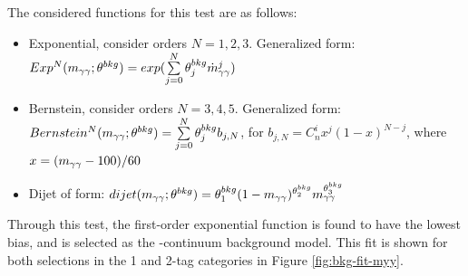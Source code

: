 The considered functions for this test are as follows:
\begin{itemize}
  \item Exponential, consider orders $N=1,2,3$. Generalized form: $Exp^N (m_{\gamma\gamma} ; \theta^{bkg}) = exp(\sum\limits_{j=0}^{N} \theta_j^{bkg} \dot m_{\gamma\gamma}^j)$
  \item Bernstein, consider orders $N=3,4,5$. Generalized form: $Bernstein^N (m_{\gamma\gamma} ; \theta^{bkg}) = \sum\limits_{j=0}^{N} \theta_j^{bkg} b_{j,N}$, for $b_{j,N} = C_n^i x^j (1-x)^{N-j}$, where $x= (m_{\gamma\gamma}-100)/60$
  \item Dijet of form: $dijet(m_{\gamma\gamma} ; \theta^{bkg}) = \theta_1^{bkg} (1-m_{\gamma\gamma})^{\theta_2^{bkg}} m_{\gamma\gamma}^{\theta_3^{bkg}}$
\end{itemize}

Through this test, the first-order exponential function is found to have the lowest bias, and is selected as the \yy-continuum background model. This fit is shown for both selections in the 1 and 2-tag categories in Figure \ref{fig:bkg-fit-myy}.

